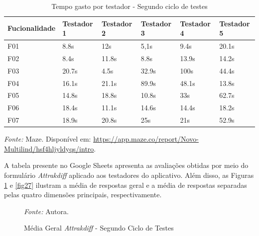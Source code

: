 \begin{table}[h!]
	\centering
	\caption{Tempo gasto por testador - Segundo ciclo de testes}
	\label{tab05}
	\begin{tabular}{l|l|l|l|l|l}
	\hline
	Fucionalidade & Testador 1 & Testador 2 & Testador 3 & Testador 4 & Testador 5 \\ 	\hline
	F01                   & 8.8s     & 12s     & 5,1s      & 9.4s       & 20.1s      \\
	F02                   & 8.4s        & 11.8s      & 8.8s      & 13.9s    & 14.2s     \\
	F03                   & 20.7s        & 4.5s      & 32.9s      & 100s     & 44.4s     \\
	F04                   & 16.1s        & 21.1s     & 89.9s     & 48.1s     & 13.8s     \\
	F05                   & 14.8s      & 18.8s      & 10.8s     & 33s     & 62.7s     \\
	F06                   & 18.4s     & 11.1s      & 14.6s     & 14.4s     & 18.2s     \\
	F07                   & 18.9s     & 20.8s      & 25s     & 21s    & 52.9s       \\ 	\hline
	\end{tabular}
	\begin{tablenotes}[flushleft]
		\centering
		\item \textit{Fonte:} Maze. Disponível em: \url{https://app.maze.co/report/Novo-Multilind/hsf4hljyldyqs/intro}.
	  \end{tablenotes}
\end{table}

A tabela presente no Google Sheets apresenta as avaliações obtidas por meio do formulário \textit{Attrakdiff} aplicado aos testadores do aplicativo. Além disso, as Figuras \ref{fig26} e \ref{fig27} ilustram a média de respostas geral e a média 
de respostas separadas pelas quatro dimensões principais, respectivamente.

\begin{figure}[h!]
	\centering
	\caption{Média Geral \textit{Attrakdiff} - Segundo Ciclo de Testes}
	\begin{tablenotes}[flushleft]
		\centering
		\item \textit{Fonte:} Autora.
	\end{tablenotes}
	\label{fig26}
\end{figure}

